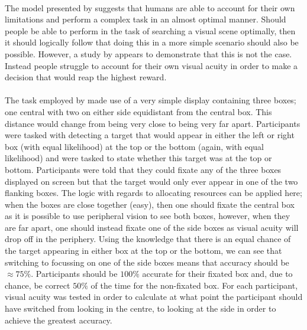 \documentclass[12pt]{article}
\begin{document}
\paragraph{} The model presented by \cite{najemnik2005optimal} suggests that humans are able to account for their own limitations and perform a complex task in an almost optimal manner. Should people be able to perform in the task of searching a visual scene optimally, then it should logically follow that doing this in a more simple scenario should also be possible. However, a study by \cite{morvan2012human} appears to demonstrate that this is not the case. Instead people struggle to account for their own visual acuity in order to make a decision that would reap the highest reward. 

\paragraph{} The task employed by \cite{morvan2012human} made use of a very simple display containing three boxes; one central with two on either side equidistant from the central box. This distance would change from being very close to being very far apart. Participants were tasked with detecting a target that would appear in either the left or right box (with equal likelihood) at the top or the bottom (again, with equal likelihood) and were tasked to state whether this target was at the top or bottom. Participants were told that they could fixate any of the three boxes displayed on screen but that the target would only ever appear in one of the two flanking boxes. The logic with regards to allocating resources can be applied here; when the boxes are close together (easy), then one should fixate the central box as it is possible to use peripheral vision to see both boxes, however, when they are far apart, one should instead fixate one of the side boxes as visual acuity will drop off in the periphery. Using the knowledge that there is an equal chance of the target appearing in either box at the top or the bottom, we can see that switching to focussing on one of the side boxes means that accuracy should be $\approx75\%$. Participants should be $100\%$ accurate for their fixated box and, due to chance, be correct $50\%$ of the time for the non-fixated box. For each participant, visual acuity was tested in order to calculate at what point the participant should have switched from looking in the centre, to looking at the side in order to achieve the greatest accuracy.
\end{document}
